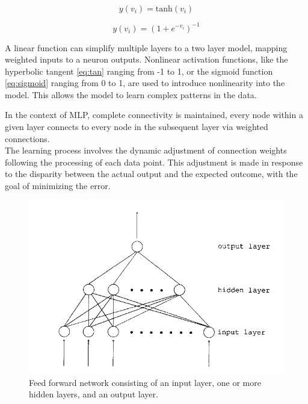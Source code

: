         \begin{equation}\label{eq:tan}
            y(v_i) = \text{tanh}(v_i) 
        \end{equation}

        \begin{equation}\label{eq:sigmoid}
            y(v_i) = (1+e^{-v_i})^{-1} 
        \end{equation}

            A linear function can simplify multiple layers to a two layer model, mapping weighted inputs to a neuron outputs. Nonlinear activation functions, like the hyperbolic tangent \ref{eq:tan} ranging from -1 to 1, or the sigmoid function \ref{eq:sigmoid} ranging from 0 to 1, are used to introduce nonlinearity into the model. This allows the model to learn complex patterns in the data.

        \newpage

        In the context of MLP, complete connectivity is maintained, every node within a given layer connects to every node in the subsequent layer via weighted connections. \\
        The learning process involves the dynamic adjustment of connection weights following the processing of each data point. This adjustment is made in response to the disparity between the actual output and the expected outcome, with the goal of minimizing the error.

        \begin{figure}[H]
            \centering
            \includegraphics[width=.7\textwidth]{../src/resources/feedforward.png}
            \caption{
                Feed forward network consisting of an input layer, one or more hidden layers, and an output layer. \cite{svozil_introduction_1997}
            }
            \label{fig:multi_layer_perceptron}
        \end{figure}
    
